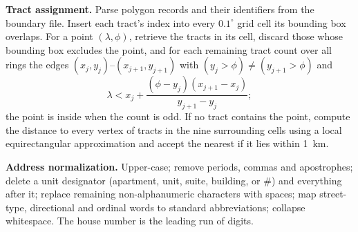 \documentclass[10pt,twocolumn,letterpaper]{article}
\newcommand{\runhead}[1]{\par\vspace{0.35ex}\noindent\textbf{#1}\hspace{0.35em}}
\begin{document}
\runhead{Tract assignment.} Parse polygon records and their identifiers from the boundary file. Insert each tract's index into every $0.1^\circ$ grid cell its bounding box overlaps. For a point $(\lambda,\phi)$, retrieve the tracts in its cell, discard those whose bounding box excludes the point, and for each remaining tract count over all rings the edges $(x_j,y_j)$--$(x_{j+1},y_{j+1})$ with $(y_j>\phi)\neq(y_{j+1}>\phi)$ and
\begin{equation}
\lambda < x_j+\frac{(\phi-y_j)(x_{j+1}-x_j)}{y_{j+1}-y_j};
\end{equation}
the point is inside when the count is odd. If no tract contains the point, compute the distance to every vertex of tracts in the nine surrounding cells using a local equirectangular approximation and accept the nearest if it lies within 1~km.

\runhead{Address normalization.} Upper-case; remove periods, commas and apostrophes; delete a unit designator (apartment, unit, suite, building, or \#) and everything after it; replace remaining non-alphanumeric characters with spaces; map street-type, directional and ordinal words to standard abbreviations; collapse whitespace. The house number is the leading run of digits.
\end{document}
